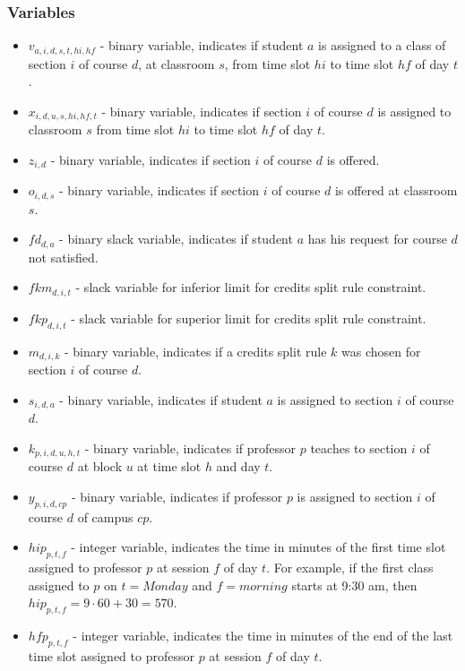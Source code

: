\subsubsection{Variables}

\begin{itemize}
\item $v_{a,i,d,s,t,hi,hf}$ - binary variable, indicates if student $a$ is assigned to a class of section $i$ of course $d$, at classroom $s$, from time slot $hi$ to time slot $hf$ of day $t$. 
\item $x_{i,d,u,s,hi,hf,t}$ - binary variable, indicates if section $i$ of course $d$ is assigned to classroom $s$ from time slot $hi$ to time slot $hf$ of day $t$. 
\item $z_{i,d}$ - binary variable, indicates if section $i$ of course $d$ is offered. 
\item $o_{i,d,s}$ - binary variable, indicates if section $i$ of course $d$ is offered at classroom $s$. 
\item $fd_{d,a}$ - binary slack variable, indicates if student $a$ has his request for course $d$ not satisfied.
\item $fkm_{d,i,t}$ - slack variable for inferior limit for credits split rule constraint. 
\item $fkp_{d,i,t}$ - slack variable for superior limit for credits split rule constraint.
\item $m_{d,i,k}$ - binary variable, indicates if a credits split rule $k$ was chosen for section $i$ of course $d$.
\item $s_{i,d,a}$ - binary variable, indicates if student $a$ is assigned to section $i$ of course $d$.
\item $k_{p,i,d,u,h,t}$ - binary variable, indicates if professor $p$ teaches to section $i$ of course $d$ at block $u$ at time slot $h$ and day $t$.
\item $y_{p,i,d,cp}$ - binary variable, indicates if professor $p$ is assigned to section $i$ of course $d$ of campus $cp$.
\item $hip_{p,t,f}$ - integer variable, indicates the time in minutes of the first time slot assigned to professor $p$ at session $f$ of day $t$. For example, if the first class assigned to $p$ on $t=Monday$ and $f=morning$ starts at 9:30 am, then $hip_{p,t,f}=9\cdot 60 + 30 = 570$.
\item $hfp_{p,t,f}$ - integer variable, indicates the time in minutes of the end of the last time slot assigned to professor $p$ at session $f$ of day $t$.

\end{itemize}
